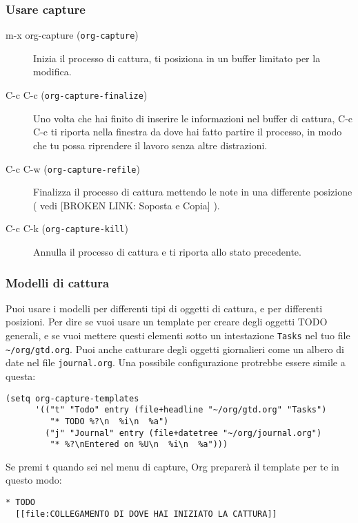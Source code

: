 \documentclass[11pt]{article}
\begin{document}
\subsubsection*{Usare capture}
\label{sec:org0c11add}
\begin{description}
\item[{m-x org-capture (\texttt{org-capture})}] Inizia il processo di cattura, ti posiziona in un buffer limitato
per la modifica.

\item[{C-c C-c (\texttt{org-capture-finalize})}] Uno volta che hai finito di inserire le informazioni nel buffer di
cattura, C-c C-c ti riporta nella finestra da dove hai
fatto partire il processo, in modo che tu possa riprendere il lavoro
senza altre distrazioni.

\item[{C-c C-w (\texttt{org-capture-refile})}] Finalizza il processo di cattura mettendo le note in una
differente posizione ( vedi [BROKEN LINK: Soposta e Copia] ).

\item[{C-c C-k (\texttt{org-capture-kill})}] Annulla il processo di cattura e ti riporta allo stato precedente.
\end{description}

\subsubsection*{Modelli di cattura}
\label{sec:org14346c5}
Puoi usare i modelli per differenti tipi di oggetti di cattura, e per
differenti posizioni. Per dire se vuoi usare un template per creare
degli oggetti TODO generali, e se vuoi mettere questi elementi sotto
un intestazione \texttt{Tasks} nel tuo file \texttt{\textasciitilde{}/org/gtd.org}. Puoi anche
catturare degli oggetti giornalieri come un albero di date nel file
\texttt{journal.org}. Una possibile configurazione protrebbe essere simile a
questa:

\begin{verbatim}
(setq org-capture-templates
      '(("t" "Todo" entry (file+headline "~/org/gtd.org" "Tasks")
         "* TODO %?\n  %i\n  %a")
        ("j" "Journal" entry (file+datetree "~/org/journal.org")
         "* %?\nEntered on %U\n  %i\n  %a")))
\end{verbatim}

Se premi t quando sei nel menu di capture, Org preparerà il
template per te in questo modo:

\begin{verbatim}
* TODO
  [[file:COLLEGAMENTO DI DOVE HAI INIZIATO LA CATTURA]]
\end{verbatim}
\end{document}
